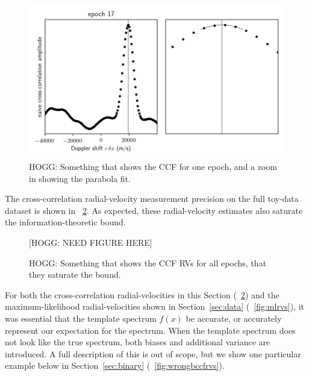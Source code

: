 \documentclass[modern]{aastex631}
\newcommand{\sectionname}{Section}
\newcommand{\secref}[1]{\sectionname~\ref{#1}}
\newcommand{\figref}[1]{\figurename~\ref{#1}}
\begin{document}
\begin{figure}[t]
  \begin{mdframed}
    \begin{center}
    \includegraphics[width=\textwidth]{../notebook/ccf.png}
    \end{center}
    \caption{HOGG: Something that shows the CCF for one epoch, and a zoom in showing the parabola fit.\label{fig:ccf}}
  \end{mdframed}
\end{figure}

The cross-correlation radial-velocity measurement precision on the full toy-data dataset is shown in \figref{fig:ccfrvs}.
As expected, these radial-velocity estimates also saturate the information-theoretic bound.

\begin{figure}[t]
  \begin{mdframed}
    \begin{center}
    [HOGG: NEED FIGURE HERE]
    \end{center}
    \caption{HOGG: Something that shows the CCF RVs for all epochs, that they saturate the bound.\label{fig:ccfrvs}}
  \end{mdframed}
\end{figure}

For both the cross-correlation radial-velocities in this \sectionname{} (\figref{fig:ccfrvs}) and the maximum-likelihood radial-velocities shown in \secref{sec:data} (\figref{fig:mlrvs}), it was essential that the template spectrum $f(x)$ be accurate, or accurately represent our expectation for the spectrum.
When the template spectrum does not look like the true spectrum, both biases and additional variance are introduced.
A full description of this is out of scope, but we show one particular example below in \secref{sec:binary} (\figref{fig:wrongbccfrvs}).
\end{document}
